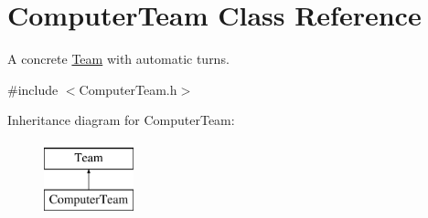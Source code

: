 \hypertarget{class_computer_team}{}\section{Computer\+Team Class Reference}
\label{class_computer_team}


A concrete \hyperlink{class_team}{Team} with automatic turns.  




{\ttfamily \#include $<$Computer\+Team.\+h$>$}

Inheritance diagram for Computer\+Team\+:\begin{figure}[H]
\begin{center}
\leavevmode
\includegraphics[height=2.000000cm]{class_computer_team}
\end{center}
\end{figure}
